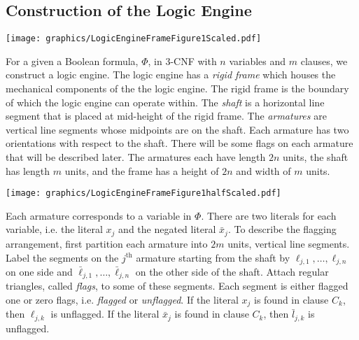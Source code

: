 \documentclass[10pt]{CSUNthesis}
\theoremstyle{plain}%
\theoremstyle{definition}
\theoremstyle{remark}
\begin{document}
\subsection{Construction of the Logic Engine}

\begin{minipage}{\linewidth}
\begin{center}
\texttt{[image: graphics/LogicEngineFrameFigure1Scaled.pdf]}
\label{fig:LogicEngineFrameFigure1.pdf}
\end{center}
\end{minipage}

For a given a Boolean formula, $\Phi$, in 3-CNF with $n$ variables and $m$ clauses, we construct a logic engine. The logic engine has a \textit{rigid frame} which houses the mechanical components of the the logic engine.  The rigid frame is the boundary of which the logic engine can operate within.  The \textit{shaft} is a horizontal line segment that is placed at mid-height of the rigid frame. 
The \textit{armatures} are vertical line segments whose midpoints are on the shaft.  
Each armature has two orientations with respect to the shaft. 
There will be some flags on each armature that will be described later.
The armatures each have length $2n$ units, the shaft has length $m$ units, and the frame has a height of $2n$ and width of $m$ units.

\begin{minipage}{\linewidth}
\begin{center}
\texttt{[image: graphics/LogicEngineFrameFigure1halfScaled.pdf]}
\label{fig:LogicEngineFrameFigure1halfScaled.pdf}
\end{center}
\end{minipage}

  Each armature corresponds to a variable in $\Phi$. There are two literals for each variable, i.e. the literal $x_j$ and the negated literal 
 $\bar{x}_j$.    
 To describe the flagging arrangement, first partition each armature into $2m$ units, vertical line segments. Label the segments on the $j^\text{th}$ armature starting from the shaft by $\ell_{j,1},\ldots,\ell_{j,n}$ on one side and  $\bar{\ell}_{j,1},\ldots,\bar{\ell}_{j,n}$ on the other side of the shaft.  
 Attach regular triangles, called \textit{flags}, to some of these segments. 
 Each segment is either flagged one or zero flags, i.e. \textit{flagged} or \textit{unflagged}. If the literal $x_j$ is found in clause $C_k$, then $\ell_{j,k}$ is unflagged.
   If the literal $\bar{x}_j$ is found in clause $C_k$, then $\bar{l}_{j,k}$ is unflagged.
\end{document}
